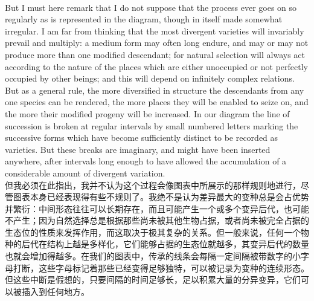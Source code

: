 \documentclass{article}
\begin{document}
\\
But I must here remark that I do not suppose that the process ever goes on so regularly as is represented in the diagram, though in itself made somewhat irregular. I am far from thinking that the most divergent varieties will invariably prevail and multiply: a medium form may often long endure, and may or may not produce more than one modified descendant; for natural selection will always act according to the nature of the places which are either unoccupied or not perfectly occupied by other beings; and this will depend on infinitely complex relations. But as a general rule, the more diversified in structure the descendants from any one species can be rendered, the more places they will be enabled to seize on, and the more their modified progeny will be increased. In our diagram the line of succession is broken at regular intervals by small numbered letters marking the successive forms which have become sufficiently distinct to be recorded as varieties. But these breaks are imaginary, and might have been inserted anywhere, after intervals long enough to have allowed the accumulation of a considerable amount of divergent variation.\\
但我必须在此指出，我并不认为这个过程会像图表中所展示的那样规则地进行，尽管图表本身已经表现得有些不规则了。我绝不是认为差异最大的变种总是会占优势并繁衍：中间形态往往可以长期存在，而且可能产生一个或多个变异后代，也可能不产生；因为自然选择总是根据那些尚未被其他生物占据，或者尚未被完全占据的生态位的性质来发挥作用，而这取决于极其复杂的关系。但一般来说，任何一个物种的后代在结构上越是多样化，它们能够占据的生态位就越多，其变异后代的数量也就会增加得越多。在我们的图表中，传承的线条会每隔一定间隔被带数字的小字母打断，这些字母标记着那些已经变得足够独特，可以被记录为变种的连续形态。但这些中断是假想的，只要间隔的时间足够长，足以积累大量的分异变异，它们可以被插入到任何地方。 \\
\end{document}
